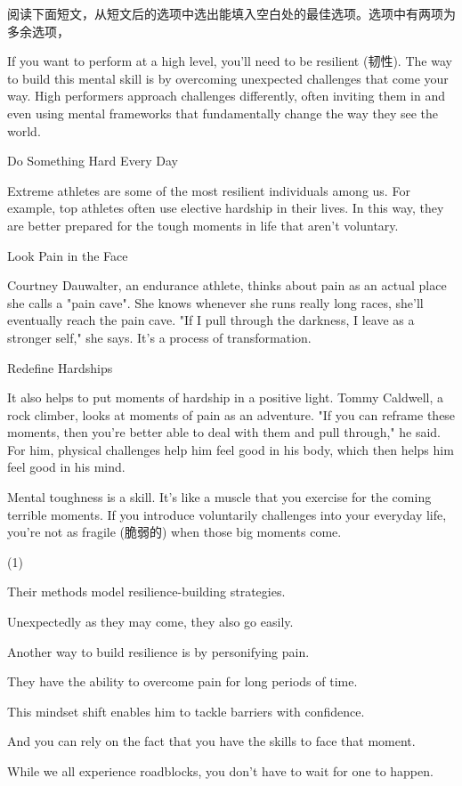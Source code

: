 \documentclass{英语试卷}
\begin{document}
\par 阅读下面短文，从短文后的选项中选出能填入空白处的最佳选项。选项中有两项为多余选项，\par
\par If you want to perform at a high level, you'll need to be resilient (韧性). The way to build this mental skill is by overcoming unexpected challenges that come your way.  High performers approach challenges differently, often inviting them in and even using mental frameworks that fundamentally change the way they see the world.\par
\par Do Something Hard Every Day\par
\par Extreme athletes are some of the most resilient individuals among us.  For example, top athletes often use elective hardship in their lives. In this way, they are better prepared for the tough moments in life that aren't voluntary.\par
\par Look Pain in the Face\par
\par {} Courtney Dauwalter, an endurance athlete, thinks about pain as an actual place she calls a "pain cave". She knows whenever she runs really long races, she'll eventually reach the pain cave. "If I pull through the darkness, I leave as a stronger self," she says. It's a process of transformation.\par
\par Redefine Hardships\par
\par It also helps to put moments of hardship in a positive light. Tommy Caldwell, a rock climber, looks at moments of pain as an adventure.  "If you can reframe these moments, then you're better able to deal with them and pull through," he said. For him, physical challenges help him feel good in his body, which then helps him feel good in his mind.\par
\par Mental toughness is a skill. It's like a muscle that you exercise for the coming terrible moments. If you introduce voluntarily challenges into your everyday life, you're not as fragile (脆弱的) when those big moments come. \par
\begin{choices}(1)
  \item Their methods model resilience-building strategies.
  \item Unexpectedly as they may come, they also go easily.
  \item Another way to build resilience is by personifying pain.
  \item They have the ability to overcome pain for long periods of time.
  \item This mindset shift enables him to tackle barriers with confidence.
  \item And you can rely on the fact that you have the skills to face that moment.
  \item While we all experience roadblocks, you don't have to wait for one to happen.
\end{choices}
\end{document}
